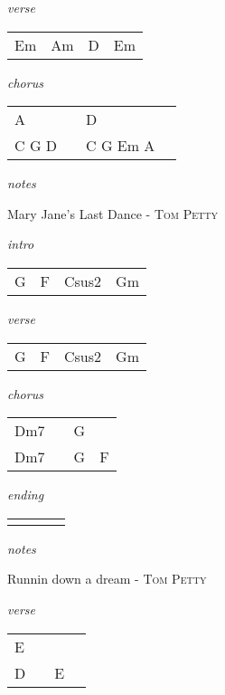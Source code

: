 \documentclass[12pt]{article}
\begin{document}
\huge
\textit{verse}

\begin{tabular}{|P{1.25in}|P{1.25in}|P{1.25in}|P{1.25in}|}
  Em  & Am  &  D &  Em \\
\end{tabular}

\textit{chorus}

\begin{tabular}{|P{1.25in}|P{1.25in}|P{1.25in}|P{1.25in}|}
  A  &   &  D &   \\
  C G D &  &  C G Em A & \\
\end{tabular}

\textit{notes}

\newpage

{\Huge Mary Jane's Last Dance} {\huge - \textsc{Tom Petty}}

\huge
\textit{intro}

\begin{tabular}{|P{1.25in}|P{1.25in}|P{1.25in}|P{1.25in}|}
  G & F & Csus2  &  Gm \\
\end{tabular}

\textit{verse}

\begin{tabular}{|P{1.25in}|P{1.25in}|P{1.25in}|P{1.25in}|}
  G & F  &  Csus2 &  Gm \\
\end{tabular}

\textit{chorus}

\begin{tabular}{|P{1.25in}|P{1.25in}|P{1.25in}|P{1.25in}|}
  Dm7 &   & G  &   \\
  Dm7 &   & G  &  F \\

\end{tabular}

\textit{ending}

\begin{tabular}{|P{1.25in}|P{1.25in}|P{1.25in}|P{1.25in}|}
   &   &   &   \\
\end{tabular}

\textit{notes}

\newpage
{\Huge Runnin down a dream} {\huge - \textsc{Tom Petty}}

\huge
\textit{verse}

\begin{tabular}{|P{1.25in}|P{1.25in}|P{1.25in}|P{1.25in}|}
  E  &   &   &   \\
  D  &   &  E &   \\
\end{tabular}
\end{document}

